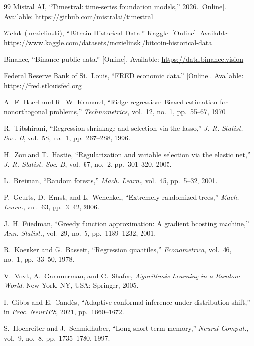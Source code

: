 \begin{thebibliography}{99}
 Mistral AI, ``Timestral: time-series foundation
models,'' 2026. [Online]. Available:
\url{https://github.com/mistralai/timestral}

 Zielak (mczielinski), ``Bitcoin Historical Data,''
Kaggle.
[Online]. Available:
\url{https://www.kaggle.com/datasets/mczielinski/bitcoin-historical-data}

 Binance, ``Binance public data.'' [Online]. Available:
\url{https://data.binance.vision}

 Federal Reserve Bank of St.~Louis, ``FRED economic data.''
[Online]. Available: \url{https://fred.stlouisfed.org}

 A.~E. Hoerl and R.~W. Kennard, ``Ridge regression:
Biased estimation for nonorthogonal problems,'' \emph{Technometrics},
vol.~12, no.~1, pp.~55--67, 1970.

 R.~Tibshirani, ``Regression shrinkage and
selection via the lasso,'' \emph{J. R. Statist. Soc. B}, vol.~58, no.~1,
pp.~267--288, 1996.

 H.~Zou and T.~Hastie, ``Regularization and variable
selection via the elastic net,'' \emph{J. R. Statist. Soc. B}, vol.~67,
no.~2, pp.~301--320, 2005.

 L.~Breiman, ``Random forests,'' \emph{Mach.
Learn.}, vol.~45, pp.~5--32, 2001.

 P.~Geurts, D.~Ernst, and L.~Wehenkel, ``Extremely
randomized trees,'' \emph{Mach. Learn.}, vol.~63, pp.~3--42, 2006.

 J.~H. Friedman, ``Greedy function approximation: A
gradient boosting machine,'' \emph{Ann. Statist.}, vol.~29, no.~5,
pp.~1189--1232, 2001.

 R.~Koenker and G.~Bassett, ``Regression
quantiles,'' \emph{Econometrica}, vol.~46, no.~1, pp.~33--50, 1978.

 V.~Vovk, A.~Gammerman, and G.~Shafer,
\emph{Algorithmic Learning in a Random World}. New York, NY, USA:
Springer, 2005.

 I.~Gibbs and E.~Cand\`es, ``Adaptive conformal
inference under distribution shift,'' in \emph{Proc. NeurIPS}, 2021,
pp.~1660--1672.

 S.~Hochreiter and J.~Schmidhuber, ``Long
short-term memory,'' \emph{Neural Comput.}, vol.~9, no.~8,
pp.~1735--1780, 1997.


\end{thebibliography}
